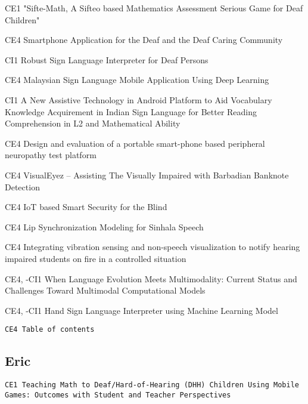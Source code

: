 CE1 "Sifte-Math, A Sifteo based Mathematics Assessment Serious Game for Deaf Children"

CE4 Smartphone Application for the Deaf and the Deaf Caring Community

CI1 Robust Sign Language Interpreter for Deaf Persons

CE4 Malaysian Sign Language Mobile Application Using Deep Learning

CI1 A New Assistive Technology in Android Platform to Aid Vocabulary Knowledge Acquirement in Indian Sign Language for Better Reading Comprehension in L2 and Mathematical Ability

CE4 Design and evaluation of a portable smart-phone based peripheral neuropathy test platform

CE4 VisualEyez – Assisting The Visually Impaired with Barbadian Banknote Detection

CE4 IoT based Smart Security for the Blind

CE4 Lip Synchronization Modeling for Sinhala Speech

CE4 Integrating vibration sensing and non-speech visualization to notify hearing impaired students on fire in a controlled situation

CE4, -CI1 When Language Evolution Meets Multimodality: Current Status and Challenges Toward Multimodal Computational Models

CE4, -CI1 Hand Sign Language Interpreter using Machine Learning Model

\texttt{CE4 Table of contents}

\subsection{Eric}

\texttt{CE1 Teaching Math to Deaf/Hard-of-Hearing (DHH) Children Using Mobile Games: Outcomes with Student and Teacher Perspectives}
